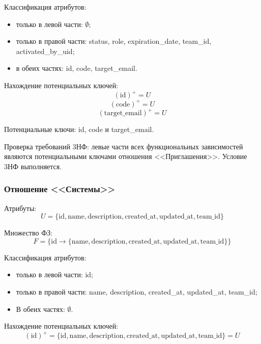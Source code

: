 Классификация атрибутов:
\begin{itemize}
    \item только в левой части: $\emptyset$;
    \item только в правой части: status, role, expiration\_date, team\_id, \\ activated\_by\_uid;
    \item в обеих частях: id, code, target\_email.
\end{itemize}

Нахождение потенциальных ключей:
\begin{equation*}
    (\text{id})^+ = U
\end{equation*}
\begin{equation*}
    (\text{code})^+ = U
\end{equation*}
\begin{equation*}
    (\text{target\_email})^+ = U
\end{equation*}

Потенциальные ключи: id, code и target\_email.

Проверка требований 3НФ: левые части всех функциональных зависимостей являются потенциальными 
ключами отношения <<Приглашения>>. Условие 3НФ выполняется.

\subsubsection{Отношение <<Системы>>}
Атрибуты:
\begin{equation*}
    U = \{\text{id}, \text{name}, \text{description}, \text{created\_at}, \text{updated\_at}, \text{team\_id}\}
\end{equation*}

Множество ФЗ:
\begin{equation*}
    F = \{ \text{id} \to \{\text{name}, \text{description}, \text{created\_at}, \text{updated\_at}, \text{team\_id}\} \}
\end{equation*}

Классификация атрибутов:
\begin{itemize}
    \item только в левой части: id;
    \item только в правой части: name, description, created\_at, updated\_at, team\_id;
    \item В обеих частях: $\emptyset$.
\end{itemize}

Нахождение потенциальных ключей:
\begin{equation*}
    (\text{id})^+ = \{\text{id}, \text{name}, \text{description}, \text{created\_at}, \text{updated\_at}, \text{team\_id}\} = U
\end{equation*}

